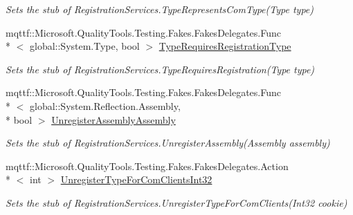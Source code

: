 \begin{DoxyCompactItemize}
\begin{DoxyCompactList}\small\item\em Sets the stub of Registration\-Services.\-Type\-Represents\-Com\-Type(\-Type type)\end{DoxyCompactList}\item 
mqttf\-::\-Microsoft.\-Quality\-Tools.\-Testing.\-Fakes.\-Fakes\-Delegates.\-Func\\*
$<$ global\-::\-System.\-Type, bool $>$ \hyperlink{class_system_1_1_runtime_1_1_interop_services_1_1_fakes_1_1_stub_registration_services_ac8311bd6036544eba7f4b357de2fee38}{Type\-Requires\-Registration\-Type}
\begin{DoxyCompactList}\small\item\em Sets the stub of Registration\-Services.\-Type\-Requires\-Registration(\-Type type)\end{DoxyCompactList}\item 
mqttf\-::\-Microsoft.\-Quality\-Tools.\-Testing.\-Fakes.\-Fakes\-Delegates.\-Func\\*
$<$ global\-::\-System.\-Reflection.\-Assembly, \\*
bool $>$ \hyperlink{class_system_1_1_runtime_1_1_interop_services_1_1_fakes_1_1_stub_registration_services_a954dabab7ad529cd8169c57faec4ac21}{Unregister\-Assembly\-Assembly}
\begin{DoxyCompactList}\small\item\em Sets the stub of Registration\-Services.\-Unregister\-Assembly(\-Assembly assembly)\end{DoxyCompactList}\item 
mqttf\-::\-Microsoft.\-Quality\-Tools.\-Testing.\-Fakes.\-Fakes\-Delegates.\-Action\\*
$<$ int $>$ \hyperlink{class_system_1_1_runtime_1_1_interop_services_1_1_fakes_1_1_stub_registration_services_a374aa900089cbd1a0b6d73e211bfccd6}{Unregister\-Type\-For\-Com\-Clients\-Int32}
\begin{DoxyCompactList}\small\item\em Sets the stub of Registration\-Services.\-Unregister\-Type\-For\-Com\-Clients(\-Int32 cookie)\end{DoxyCompactList}\end{DoxyCompactItemize}
